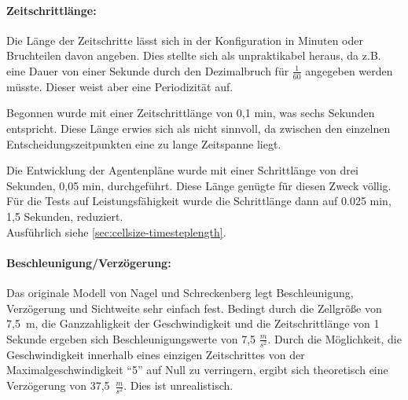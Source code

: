 
\paragraph*{Zeitschrittlänge:}
Die Länge der Zeitschritte lässt sich in der Konfiguration in Minuten oder Bruchteilen davon angeben. 
Dies stellte sich als unpraktikabel heraus, da z.B. eine Dauer von einer Sekunde durch den Dezimalbruch für $\frac{1}{60}$ angegeben werden müsste. Dieser weist aber eine Periodizität auf.

Begonnen wurde mit einer Zeitschrittlänge von 0,1 min, was sechs Sekunden entspricht. 
Diese Länge erwies sich als nicht sinnvoll, da zwischen den einzelnen Entscheidungszeitpunkten eine zu lange Zeitspanne liegt.

Die Entwicklung der Agentenpläne wurde mit einer Schrittlänge von drei Sekunden, 0,05 min, durchgeführt. Diese Länge genügte für diesen Zweck völlig.
Für die Tests auf Leistungsfähigkeit wurde die Schrittlänge dann auf 0.025 min, 1,5 Sekunden, reduziert.
\\
Ausführlich siehe \cref{sec:cellsize-timesteplength}.



\paragraph*{Beschleunigung/Verzögerung:}
\label{beschl-verz}
Das originale Modell von Nagel und Schreckenberg legt Beschleunigung, Verzögerung und Sichtweite sehr einfach fest.
Bedingt durch die Zellgröße von \mbox{7,5 m}, die Ganzzahligkeit der Geschwindigkeit und die Zeitschrittlänge von 1 Sekunde ergeben sich Beschleunigungswerte von 7,5 $\frac{m}{s^{2}}$. 
Durch die Möglichkeit, die Geschwindigkeit innerhalb eines einzigen Zeitschrittes von der Maximalgeschwindigkeit \enquote{5} auf Null zu verringern, ergibt sich theoretisch eine Verzögerung von \mbox{37,5 $\frac{m}{s^{2}}$}.
Dies ist unrealistisch.

